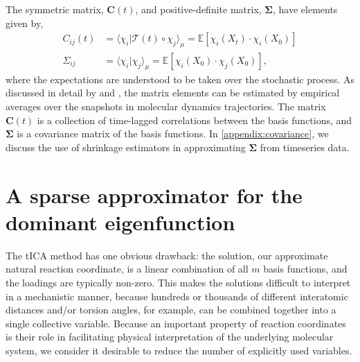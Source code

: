 \documentclass[aip, jcp, reprint, nolinenumbers, twocolumn, nobalancelastpage, nofootinbib]{revtex4-1}
\begin{document}
The symmetric matrix, $\mathbf{C}(t)$, and positive-definite matrix, $\mathbf{\Sigma}$, have elements given by,
\begin{align}
    C_{ij}(t) &= \langle \chi_i | \mathcal{T}(t) \circ \chi_j  \rangle_\mu = \mathbb{E}\left[ \chi_i(X_t) \cdot \chi_i(X_0) \right] \\
    \Sigma_{ij} &= \langle \chi_i | \chi_j \rangle_\mu = \mathbb{E}\left[ \chi_i(X_0) \cdot \chi_j(X_0)\right],
\end{align}
where the expectations are understood to be taken over the stochastic process. As discussed in detail by \citet{schwantes2013improvements} and \citet{perez2013identification}, the matrix elements can be estimated by empirical averages over the snapshots in molecular dynamics trajectories. The matrix $\mathbf{C}(t)$ is a collection of time-lagged correlations between the basis functions, and $\mathbf{\Sigma}$ is a covariance matrix of the basis functions. In \cref{appendix:covariance}, we discuss the use of shrinkage estimators in approximating $\mathbf{\Sigma}$ from timeseries data.

\section{A sparse approximator for the dominant eigenfunction}

%

The tICA method has one obvious drawback: the solution, our approximate natural reaction coordinate, is a linear combination of all $m$ basis functions, and the loadings are typically non-zero. This makes the solutions difficult to interpret in a mechanistic manner, because hundreds or thousands of different interatomic distances and/or torsion angles, for example, can be combined together into a single collective variable. Because an important property of reaction coordinates is their role in facilitating physical interpretation of the underlying molecular system, we consider it desirable to reduce the number of explicitly used variables.
\end{document}
